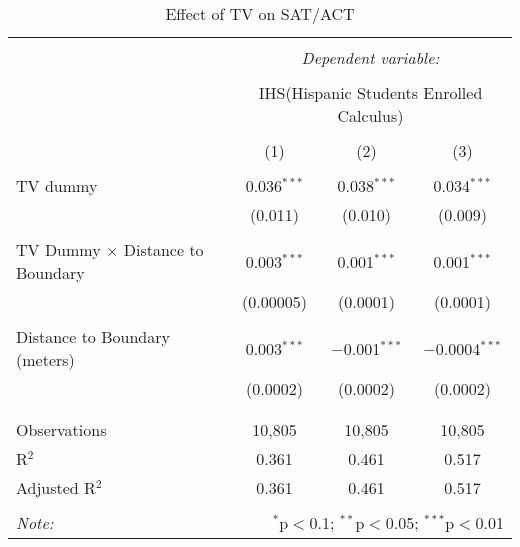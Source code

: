
\begin{table}[!htbp] \centering 
  \caption{Effect of TV on SAT/ACT} 
  \label{} 
\begin{tabular}{@{\extracolsep{-2pt}}lccc} 
\\[-1.8ex]\hline 
\hline \\[-1.8ex] 
 & \multicolumn{3}{c}{\textit{Dependent variable:}} \\ 
\cline{2-4} 
\\[-1.8ex] & \multicolumn{3}{c}{IHS(Hispanic Students Enrolled Calculus)} \\ 
\\[-1.8ex] & (1) & (2) & (3)\\ 
\hline \\[-1.8ex] 
 TV dummy & 0.036$^{***}$ & 0.038$^{***}$ & 0.034$^{***}$ \\ 
  & (0.011) & (0.010) & (0.009) \\ 
  & & & \\ 
 TV Dummy $\times$ Distance to Boundary & 0.003$^{***}$ & 0.001$^{***}$ & 0.001$^{***}$ \\ 
  & (0.00005) & (0.0001) & (0.0001) \\ 
  & & & \\ 
 Distance to Boundary (meters) & 0.003$^{***}$ & $-$0.001$^{***}$ & $-$0.0004$^{***}$ \\ 
  & (0.0002) & (0.0002) & (0.0002) \\ 
  & & & \\ 
\hline \\[-1.8ex] 
Observations & 10,805 & 10,805 & 10,805 \\ 
R$^{2}$ & 0.361 & 0.461 & 0.517 \\ 
Adjusted R$^{2}$ & 0.361 & 0.461 & 0.517 \\ 
\hline 
\hline \\[-1.8ex] 
\textit{Note:}  & \multicolumn{3}{r}{$^{*}$p$<$0.1; $^{**}$p$<$0.05; $^{***}$p$<$0.01} \\ 
\end{tabular} 
\end{table} 

